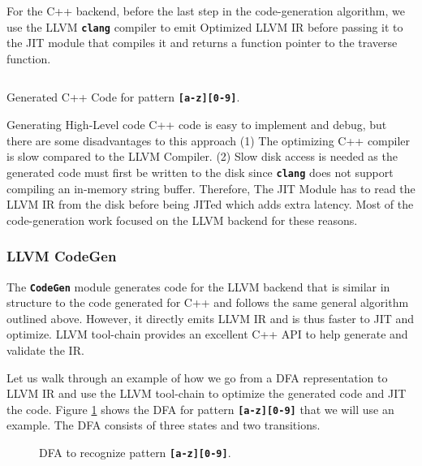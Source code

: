 For the C++ backend, before the last step in the code-generation algorithm, we use the LLVM \texttt{\textbf{clang}} compiler to emit Optimized LLVM IR before passing it to the JIT module that compiles it and returns a function pointer to the traverse function. 

\begin{listing}[htbp]
\inputminted[breaklines,frame=lines,linenos]{cpp}{code/ex.cpp}
\caption{Generated C++ Code for pattern \texttt{\textbf{[a-z][0-9]}}.}
\label{lst:cppex}
\end{listing}

Generating High-Level code C++ code is easy to implement and debug, but there are some disadvantages to this approach (1) The optimizing C++ compiler is slow compared to the LLVM Compiler. (2) Slow disk access is needed as the generated code must first be written to the disk since \texttt{\textbf{clang}} does not support compiling an in-memory string buffer. Therefore, The JIT Module has to read the LLVM IR from the disk before being JITed which adds extra latency. Most of the code-generation work focused on the LLVM backend for these reasons.


\subsubsection{LLVM CodeGen}
The \texttt{\textbf{CodeGen}} module generates code for the LLVM backend that is similar in structure to the code generated for C++ and follows the same general algorithm outlined above. However, it directly emits LLVM IR and is thus faster to JIT and optimize. LLVM tool-chain provides an excellent C++ API \cite{llvmapi} to help generate and validate the IR.

Let us walk through an example of how we go from a DFA representation to LLVM IR and use the LLVM tool-chain to optimize the generated code and JIT the code. Figure \ref{fig:dfacodegenex} shows the DFA for pattern \texttt{\textbf{[a-z][0-9]}} that we will use an example. The DFA consists of three states and two transitions.

\begin{figure}[H]
\centering
{}
\caption{DFA to recognize pattern \texttt{\textbf{[a-z][0-9]}}.}
\label{fig:dfacodegenex}
\end{figure}

